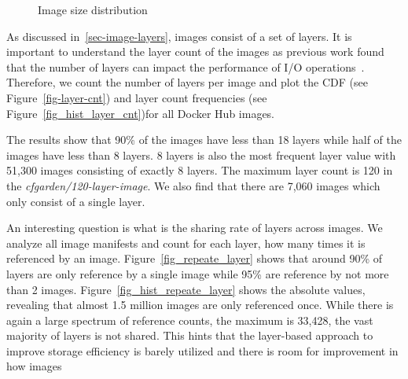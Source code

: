 \begin{figure}[!t]
	\centering
	\caption{Image size distribution}
	\label{fig:image-size}
\end{figure}

As discussed in~\ref{sec-image-layers}, images consist of a set of layers.
It is important to understand the layer count of the images as previous
work found that the number of layers can impact the performance of
I/O operations~\cite{slacker}. Therefore, we count the number of layers
per image and plot the CDF (see Figure~\ref{fig-layer-cnt})
and layer count frequencies (see Figure~\ref{fig_hist_layer_cnt})for all
Docker Hub images.

The results show that 90\% of the images have less than 18 layers while
half of the images have less than 8 layers. 8 layers is also the most
frequent layer value with 51,300 images consisting of exactly 8 layers.
The maximum layer count is 120 in the \textit{cfgarden/120-layer-image}.
We also find that there are 7,060 images which only consist of a single layer.

%


An interesting question is what is the sharing rate of layers across images.
We analyze all image manifests and count for each layer, how many times it
is referenced by an image. Figure~\ref{fig_repeate_layer} shows that around 90\%
of layers are only reference by a single image while 95\% are reference by not
more than 2 images.
%
Figure~\ref{fig_hist_repeate_layer} shows the absolute values, revealing that
almost 1.5 million images are only referenced once. While there is again a large
spectrum of reference counts, the maximum is 33,428, the vast majority of layers
is not shared. This hints that the layer-based approach to improve storage
efficiency is barely utilized and there is room for improvement in how images

